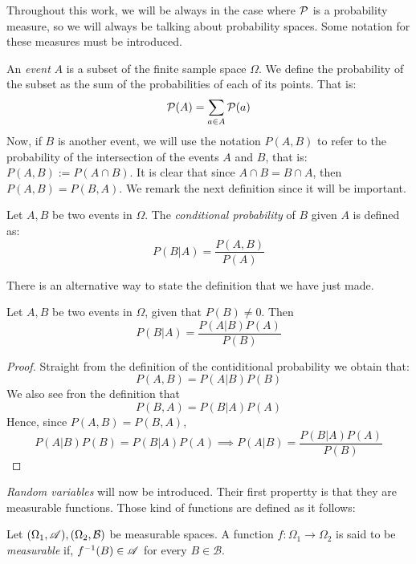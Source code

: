 Throughout this work, we will be always in the case where $\mathcal{P}$ is a probability measure, so we will always be talking about probability spaces. Some notation for these measures must be introduced.

An \emph{event} $A$ is a subset of the finite sample space $\Omega$. We define the probability of the subset as the sum of the probabilities of each of its points. That is:
$$
\mathcal{P}(A) = \sum_{a \in A}\mathcal{P}(a)
$$
Now, if $B$ is another event, we will use the notation $P(A,B)$
 to refer to the probability of the intersection of the events $A$ and $B$, that is: $P(A,B) := P(A\cap B)$. It is clear that since $A \cap B = B \cap A$, then $P(A,B) = P(B,A)$. We remark the next definition since it will be important.

\begin{ndef}
Let $A,B$ be two events in $\Omega$. The \emph{conditional probability} of $B$ given $A$ is defined as:
$$
P(B|A) = \frac{P(A,B)}{P(A)}
$$
\end{ndef}




There is an alternative way to state the definition that we have just made.

\begin{nth}
Let $A,B$ be two events in $\Omega$, given that $P(B) \neq 0$. Then
$$
P(B|A) = \frac{P(A|B) P(A)}{P(B)}
$$
\end{nth}
\begin{proof}
Straight from the definition of the contiditional probability we obtain that:
$$
P(A,B) = P(A|B)P(B)
$$
We also see fron the definition that
$$
P(B,A) = P(B|A)P(A)
$$
Hence, since $P(A,B) = P(B,A)$,
$$
P(A|B)P(B) = P(B|A)P(A) \implies P(A|B) = \frac{P(B|A)P(A)}{P(B)}
$$
\end{proof}




\emph{Random variables} will now be introduced. Their first propertty is that they are measurable functions. Those kind of functions are defined as it follows:

\begin{ndef}
Let $(\Omega_1, \mathscr{A}),(\Omega_2, \mathcal B)$ be measurable spaces. A function $f: \Omega_1 \to \Omega_2$ is said to be \emph{measurable} if, $f^{-1}(B) \in \mathscr{A}$ for every $B \in \mathcal B$.
\end{ndef}

